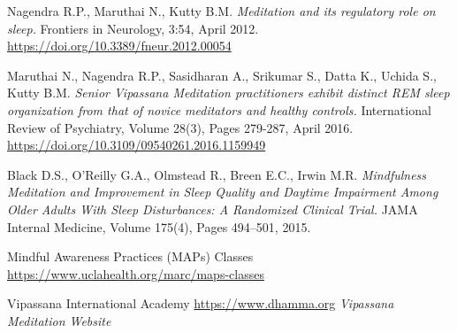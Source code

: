 \documentclass[a4paper, amsfonts, amssymb, amsmath, reprint, showkeys, nofootinbib, twoside]{revtex4-1}
\begin{document}
\begin{thebibliography}{99}
  Nagendra R.P., Maruthai N., Kutty B.M.
  \textit{Meditation and its regulatory role on sleep.}
  Frontiers in Neurology, 3:54, April 2012.
  \url{https://doi.org/10.3389/fneur.2012.00054}

  Maruthai N., Nagendra R.P., Sasidharan A., Srikumar S., Datta K., Uchida S., Kutty B.M.
  \textit{Senior Vipassana Meditation practitioners exhibit distinct REM sleep
    organization from that of novice meditators and healthy controls.}
  International Review of Psychiatry, Volume 28(3), Pages 279-287, April 2016.
  \url{https://doi.org/10.3109/09540261.2016.1159949}

  Black D.S., O’Reilly G.A., Olmstead R., Breen E.C., Irwin M.R.
  \textit{Mindfulness Meditation and Improvement in Sleep Quality and Daytime Impairment
    Among Older Adults With Sleep Disturbances: A Randomized Clinical Trial.}
  JAMA Internal Medicine, Volume 175(4), Pages 494–501, 2015.

  Mindful Awareness Practices (MAPs) Classes
  \url{https://www.uclahealth.org/marc/maps-classes}

  Vipassana International Academy
  \url{https://www.dhamma.org}
  \textit{Vipassana Meditation Website}


\end{thebibliography}
\end{document}
